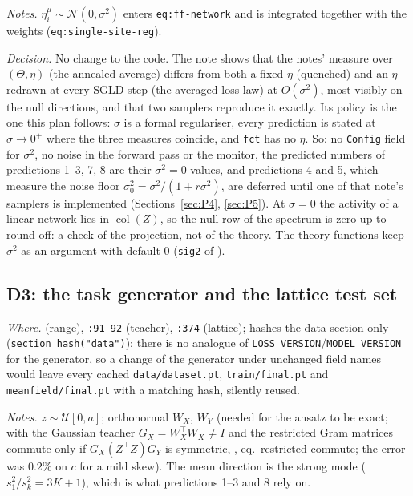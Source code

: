 \documentclass[11pt,a4paper]{article}
\newcommand{\col}{\operatorname{col}}
\newcommand{\code}[1]{\texttt{#1}}
\begin{document}
\emph{Notes.} $\eta^\mu_i\sim\mathcal N(0,\sigma^2)$ enters \code{eq:ff-network} and is integrated together with the weights (\code{eq:single-site-reg}).

\emph{Decision.} No change to the code. The note  shows that the notes' measure over $(\Theta, \eta)$ (the annealed average) differs from both a fixed $\eta$ (quenched) and an $\eta$ redrawn at every SGLD step (the averaged-loss law) at $O(\sigma^2)$, most visibly on the null directions, and that two samplers reproduce it exactly. Its policy is the one this plan follows: $\sigma$ is a formal regulariser, every prediction is stated at $\sigma\to0^+$ where the three measures coincide, and \code{fct} has no $\eta$. So: no \code{Config} field for $\sigma^2$, no noise in the forward pass or the monitor, the predicted numbers of predictions 1--3, 7, 8 are their $\sigma^2 = 0$ values, and predictions 4 and 5, which measure the noise floor $\sigma_0^2 = \sigma^2/(1 + r\sigma^2)$, are deferred until one of that note's samplers is implemented (Sections~\ref{sec:P4}, \ref{sec:P5}). At $\sigma = 0$ the activity of a linear network lies in $\col(Z)$, so the null row of the spectrum is zero up to round-off: a check of the projection, not of the theory. The theory functions keep $\sigma^2$ as an argument with default $0$ (\code{sig2} of ).

\subsection{D3: the task generator and the lattice test set}
\label{sec:D3}
\emph{Where.}  (range), \code{:91--92} (teacher), \code{:374} (lattice);  hashes the data section only (\code{section\_hash("data")}): there is no analogue of \code{LOSS\_VERSION}/\code{MODEL\_VERSION} for the generator, so a change of the generator under unchanged field names would leave every cached \code{data/dataset.pt}, \code{train/final.pt} and \code{meanfield/final.pt} with a matching hash, silently reused.

\emph{Notes.} $z\sim\mathcal U[0,a]$; orthonormal $W_X$, $W_Y$ (needed for the ansatz to be exact; with the Gaussian teacher $G_X = W_X^\top W_X\ne I$ and the restricted Gram matrices commute only if $G_X(Z^\top Z)G_Y$ is symmetric, , eq.~restricted-commute; the error was $0.2\%$ on $c$ for a mild skew). The mean direction is the strong mode ($s_1^2/s_k^2 = 3K+1$), which is what predictions 1--3 and 8 rely on.
\end{document}
